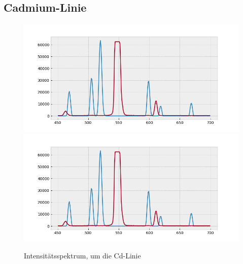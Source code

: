     \subsection{Cadmium-Linie}
        \begin{myframe}{\subsecname}
            \begin{minipage}{.3\textwidth}
                \begin{figure}
                    \centering
                    \includegraphics[height=.32\textheight, trim={1.2cm 0 17.5cm 1cm}, clip]{img/wl}
                    \includegraphics[height=.32\textheight, trim={4cm 0 7cm 1cm}, clip]{img/wl}
                    \caption{Intensit\"atsspektrum, um die Cd-Linie}
                \end{figure}
            \end{minipage}
        \end{myframe}

